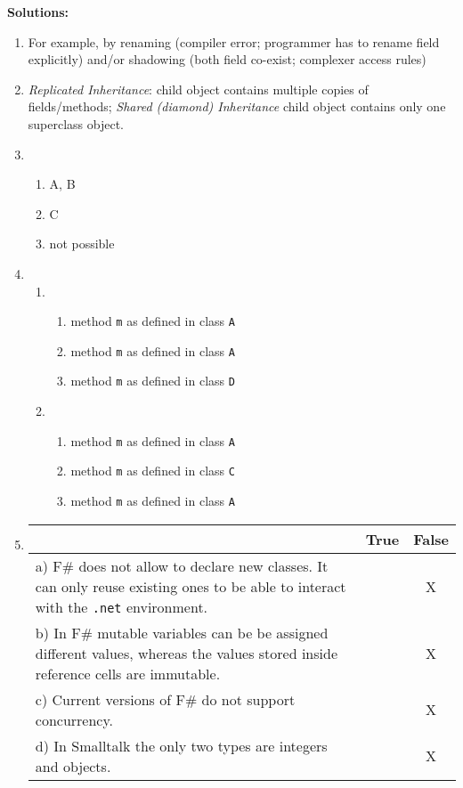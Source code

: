 \documentclass{article}
\newcommand{\solution}[1] {\textbf{Solutions:}\\ #1}
\begin{document}
\solution{
\begin{enumerate}
\item For example, by renaming (compiler error; programmer has to
  rename field explicitly) and/or shadowing (both field co-exist;
  complexer access rules)
\item \emph{Replicated Inheritance}: child object contains  multiple
  copies of fields/methods; 
  \emph{Shared (diamond)  Inheritance} child object contains only one
  superclass object.
\item 
    \begin{enumerate}
      \item A, B
      \item C
      \item not possible
    \end{enumerate}
\item 
    \begin{enumerate}
    \item 
    \begin{enumerate}
    \item method \lstinline!m! as defined in class \lstinline!A!
    \item method \lstinline!m! as defined in class \lstinline!A!
    \item method \lstinline!m! as defined in class \lstinline!D!
 \end{enumerate}
    \item 
    \begin{enumerate}
    \item method \lstinline!m! as defined in class \lstinline!A!
    \item method \lstinline!m! as defined in class \lstinline!C!
    \item method \lstinline!m! as defined in class \lstinline!A!
    \end{enumerate}
    \end{enumerate}
\item
      \begin{tabular}{|p{6cm}|c|c|}\hline
      & True & False \\ \hline
       a) F\# does not allow to declare new classes. It can only reuse
      existing ones to be able to interact with the \texttt{.net}
      environment. & & X \\\hline
      b) In F\# mutable variables can be be assigned different values, whereas
      the values stored inside reference cells are immutable. & & X \\\hline
      c) Current versions of F\# do not support concurrency. & & X \\\hline
      d) In Smalltalk the only two types are integers and objects. & &
      X \\\hline
   \end{tabular}\\

\end{enumerate}
}
\end{document}
